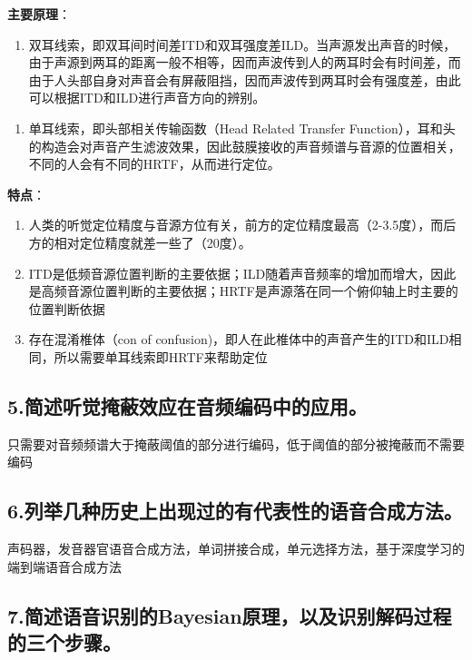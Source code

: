 \documentclass[]{article}
\begin{document}
\textbf{主要原理}：

\begin{enumerate}
\def\labelenumi{\arabic{enumi}.}
\item
  双耳线索，即双耳间时间差ITD和双耳强度差ILD。当声源发出声音的时候，由于声源到两耳的距离一般不相等，因而声波传到人的两耳时会有时间差，而由于人头部自身对声音会有屏蔽阻挡，因而声波传到两耳时会有强度差，由此可以根据ITD和ILD进行声音方向的辨别。
\end{enumerate}

\begin{enumerate}
\def\labelenumi{\arabic{enumi}.}
\item
  单耳线索，即头部相关传输函数（Head Related Transfer
  Function），耳和头的构造会对声音产生滤波效果，因此鼓膜接收的声音频谱与音源的位置相关，不同的人会有不同的HRTF，从而进行定位。
\end{enumerate}

\textbf{特点}：

\begin{enumerate}
\def\labelenumi{\arabic{enumi}.}
\item
  人类的听觉定位精度与音源方位有关，前方的定位精度最高（2-3.5度），而后方的相对定位精度就差一些了（20度）。
\item
  ITD是低频音源位置判断的主要依据；ILD随着声音频率的增加而增大，因此是高频音源位置判断的主要依据；HRTF是声源落在同一个俯仰轴上时主要的位置判断依据
\item
  存在混淆椎体（con of
  confusion)，即人在此椎体中的声音产生的ITD和ILD相同，所以需要单耳线索即HRTF来帮助定位
\end{enumerate}

\hypertarget{header-n104}{%
\subsection{5.简述听觉掩蔽效应在音频编码中的应用。}\label{header-n104}}

只需要对音频频谱大于掩蔽阈值的部分进行编码，低于阈值的部分被掩蔽而不需要编码

\hypertarget{header-n106}{%
\subsection{6.列举几种历史上出现过的有代表性的语音合成方法。}\label{header-n106}}

声码器，发音器官语音合成方法，单词拼接合成，单元选择方法，基于深度学习的端到端语音合成方法

\hypertarget{header-n108}{%
\subsection{7.简述语音识别的Bayesian原理，以及识别解码过程的三个步骤。}\label{header-n108}}
\end{document}
